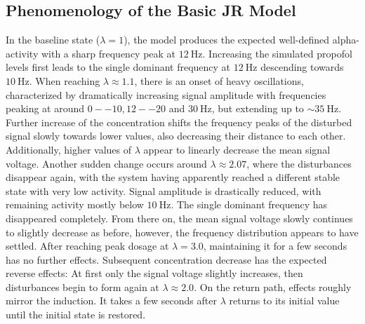 \toggletrue{drawLocRoc}
\def\simRunName{JR_LONGER_INIT}
\def\locStart{1.1}
\def\locST{6.61}
\def\locEnd{2.07}
\def\locET{18.89}
\def\rocStart{2.0}
\def\rocST{48.63}
\def\rocEnd{1.00}
\def\rocET{62.0}
\subsection{Phenomenology of the Basic JR Model}
    In the baseline state ($\lambda = 1$), the model produces the expected well-defined alpha-activity
    with a sharp frequency peak at $\SI{12}{\hertz}$.
    Increasing the simulated propofol levels first leads to the single dominant frequency at $\SI{12}{\hertz} $
    descending towards $\SI{10}{\hertz} $.
    When reaching $\lambda \approx \locStart $,
    there is an onset of heavy oscillations, characterized by dramatically increasing signal amplitude
    with frequencies peaking at around $0--10, 12--20$ and $ \SI{30}{\hertz} $,
    but extending up to $\sim \SI{35}{\hertz} $.
    Further increase of the concentration shifts the frequency peaks of the disturbed signal slowly towards lower
    values, also decreasing their distance to each other.
    Additionally, higher values of $\lambda$ appear to linearly decrease the mean signal voltage.
    Another sudden change occurs around $\lambda \approx \locEnd $,
    where the disturbances disappear again,
    with the system having apparently reached a different stable state with very low activity.
    Signal amplitude is drastically reduced, with remaining activity mostly below $\SI{10}{\hertz}$.
    The single dominant frequency has disappeared completely.
    From there on, the mean signal voltage slowly continues to slightly decrease as before,
    however, the frequency distribution appears to have settled.
    After reaching peak dosage at $\lambda = 3.0$, maintaining it for a few seconds has no further effects.
    Subsequent concentration decrease has the expected reverse effects:
    At first only the signal voltage slightly increases,
    then disturbances begin to form again at $\lambda \approx \rocStart$.
    On the return path, effects roughly mirror the induction.
    It takes a few seconds after $\lambda$ returns to its initial value until the initial state is restored.

